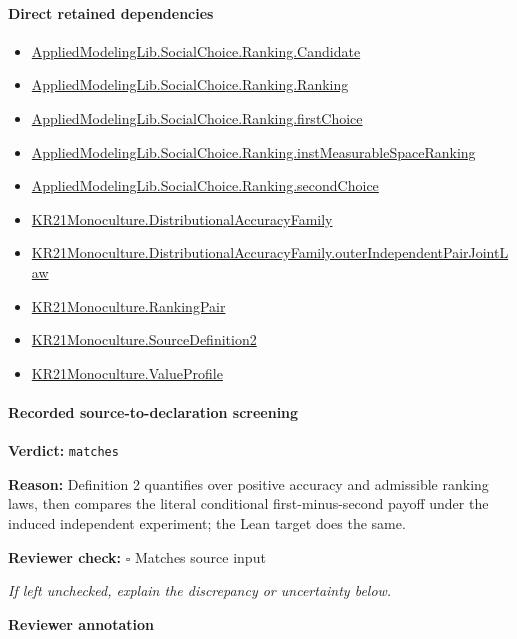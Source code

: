 \documentclass[10pt]{article}
\newcommand{\reviewerbox}{%
  \par\noindent\fbox{\parbox{0.96\linewidth}{\rule{0pt}{0.38in}}}\par
}
\newcommand{\reviewmatch}[1]{%
  \par\noindent\textbf{Reviewer check:} $\square$\; #1\par
  \noindent\emph{If left unchecked, explain the discrepancy or uncertainty below.}\par
}
\begin{document}
\paragraph{Direct retained dependencies}
\begin{itemize}\raggedright
\item \hyperlink{library-prerequisite-8c0e6c25845ae78a}{Applied\allowbreak{}Modeling\allowbreak{}Lib.\allowbreak{}Social\allowbreak{}Choice.\allowbreak{}Ranking.\allowbreak{}Candidate}
\item \hyperlink{library-prerequisite-5cde54446d1ae021}{Applied\allowbreak{}Modeling\allowbreak{}Lib.\allowbreak{}Social\allowbreak{}Choice.\allowbreak{}Ranking.\allowbreak{}Ranking}
\item \hyperlink{governing-declaration-08e457479ee6cf15}{Applied\allowbreak{}Modeling\allowbreak{}Lib.\allowbreak{}Social\allowbreak{}Choice.\allowbreak{}Ranking.\allowbreak{}first\allowbreak{}Choice}
\item \hyperlink{governing-declaration-30ca9c740ef703ec}{Applied\allowbreak{}Modeling\allowbreak{}Lib.\allowbreak{}Social\allowbreak{}Choice.\allowbreak{}Ranking.\allowbreak{}inst\allowbreak{}Measurable\allowbreak{}Space\allowbreak{}Ranking}
\item \hyperlink{governing-declaration-25ac37baf58f31e2}{Applied\allowbreak{}Modeling\allowbreak{}Lib.\allowbreak{}Social\allowbreak{}Choice.\allowbreak{}Ranking.\allowbreak{}second\allowbreak{}Choice}
\item \hyperlink{paper-prerequisite-ee564fa2921e1add}{KR21\allowbreak{}Monoculture.\allowbreak{}Distributional\allowbreak{}Accuracy\allowbreak{}Family}
\item \hyperlink{governing-declaration-e6c9a24a5d927c25}{KR21\allowbreak{}Monoculture.\allowbreak{}Distributional\allowbreak{}Accuracy\allowbreak{}Family.\allowbreak{}outer\allowbreak{}Independent\allowbreak{}Pair\allowbreak{}Joint\allowbreak{}Law}
\item \hyperlink{governing-declaration-90a7e19d973f51cb}{KR21\allowbreak{}Monoculture.\allowbreak{}Ranking\allowbreak{}Pair}
\item \hyperlink{governing-declaration-32b901a052dec598}{KR21\allowbreak{}Monoculture.\allowbreak{}Source\allowbreak{}Definition2}
\item \hyperlink{paper-prerequisite-c0e41e9b0e843969}{KR21\allowbreak{}Monoculture.\allowbreak{}Value\allowbreak{}Profile}
\end{itemize}
\paragraph{Recorded source-to-declaration screening}
\textbf{Verdict:} \texttt{matches}
\\
{\raggedright
\textbf{Reason:} Definition 2 quantifies over positive accuracy and admissible ranking laws, then compares the literal conditional first-\allowbreak{}minus-\allowbreak{}second payoff under the induced independent experiment;\allowbreak{} the Lean target does the same.\allowbreak{}
\par}
\reviewmatch{Matches source input}
\noindent\textbf{Reviewer annotation}\par
\reviewerbox
\clearpage
\hypertarget{paper-prerequisite-55b50c3e2be0a26c}{}
\end{document}
